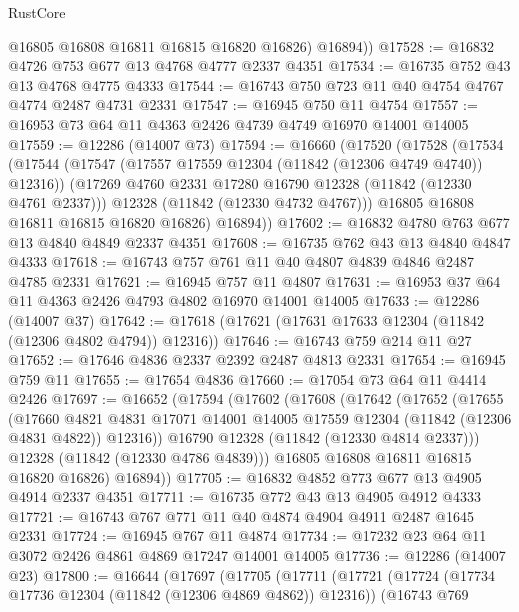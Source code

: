 \begin{lexlean}{RustCore}
\begin{coremodule}
          @16805
          @16808
          @16811
          @16815
          @16820
          @16826)
        @16894))
@17528 := @16832 @4726 @753 @677 @13 @4768 @4777 @2337 @4351
@17534 := @16735 @752 @43 @13 @4768 @4775 @4333
@17544 := @16743 @750 @723 @11 @40 @4754 @4767 @4774 @2487 @4731 @2331
@17547 := @16945 @750 @11 @4754
@17557 := @16953 @73 @64 @11 @4363 @2426 @4739 @4749 @16970 @14001 @14005
@17559 := @12286 (@14007 @73)
@17594 := @16660
    (@17520
      (@17528
        (@17534
          (@17544
            (@17547 (@17557 @17559 @12304 (@11842 (@12306 @4749 @4740)) @12316))
            (@17269 @4760 @2331 @17280 @16790 @12328 (@11842 (@12330 @4761 @2337)))
            @12328
            (@11842 (@12330 @4732 @4767)))
          @16805
          @16808
          @16811
          @16815
          @16820
          @16826)
        @16894))
@17602 := @16832 @4780 @763 @677 @13 @4840 @4849 @2337 @4351
@17608 := @16735 @762 @43 @13 @4840 @4847 @4333
@17618 := @16743 @757 @761 @11 @40 @4807 @4839 @4846 @2487 @4785 @2331
@17621 := @16945 @757 @11 @4807
@17631 := @16953 @37 @64 @11 @4363 @2426 @4793 @4802 @16970 @14001 @14005
@17633 := @12286 (@14007 @37)
@17642 := @17618 (@17621 (@17631 @17633 @12304 (@11842 (@12306 @4802 @4794)) @12316))
@17646 := @16743 @759 @214 @11 @27
@17652 := @17646 @4836 @2337 @2392 @2487 @4813 @2331
@17654 := @16945 @759 @11
@17655 := @17654 @4836
@17660 := @17054 @73 @64 @11 @4414 @2426
@17697 := @16652
    (@17594
      (@17602
        (@17608
          (@17642
            (@17652
              (@17655
                (@17660
                  @4821
                  @4831
                  @17071
                  @14001
                  @14005
                  @17559
                  @12304
                  (@11842 (@12306 @4831 @4822))
                  @12316))
              @16790
              @12328
              (@11842 (@12330 @4814 @2337)))
            @12328
            (@11842 (@12330 @4786 @4839)))
          @16805
          @16808
          @16811
          @16815
          @16820
          @16826)
        @16894))
@17705 := @16832 @4852 @773 @677 @13 @4905 @4914 @2337 @4351
@17711 := @16735 @772 @43 @13 @4905 @4912 @4333
@17721 := @16743 @767 @771 @11 @40 @4874 @4904 @4911 @2487 @1645 @2331
@17724 := @16945 @767 @11 @4874
@17734 := @17232 @23 @64 @11 @3072 @2426 @4861 @4869 @17247 @14001 @14005
@17736 := @12286 (@14007 @23)
@17800 := @16644
    (@17697
      (@17705
        (@17711
          (@17721
            (@17724 (@17734 @17736 @12304 (@11842 (@12306 @4869 @4862)) @12316))
            (@16743
              @769

\end{coremodule}
\end{lexlean}
